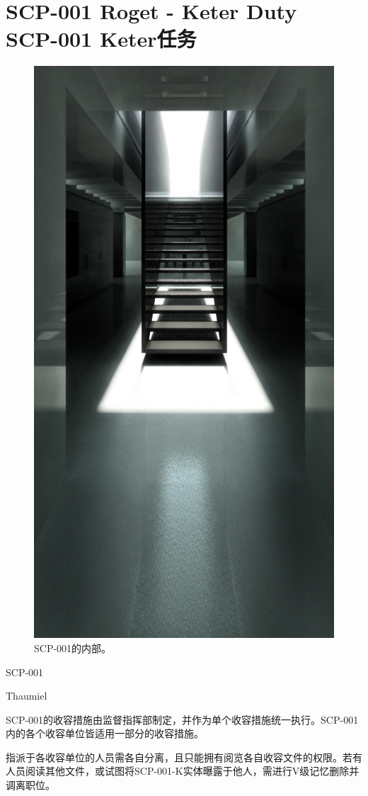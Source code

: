 \chapter[SCP-001 Keter任务]{
	SCP-001 Roget - Keter Duty \\
	SCP-001 Keter任务
}

\label{chap:SCP-001.keter.duty}

\begin{figure}[H]
    \centering
    \includegraphics[width=0.4\linewidth]{images/SCP.001.keter.duty.jpg}
    \caption*{SCP-001的内部。}
\end{figure}

SCP-001

Thaumiel

SCP-001的收容措施由监督指挥部制定，并作为单个收容措施统一执行。SCP-001内的各个收容单位皆适用一部分的收容措施。

指派于各收容单位的人员需各自分离，且只能拥有阅览各自收容文件的权限。若有人员阅读其他文件，或试图将SCP-001-K实体曝露于他人，需进行V级记忆删除并调离职位。

